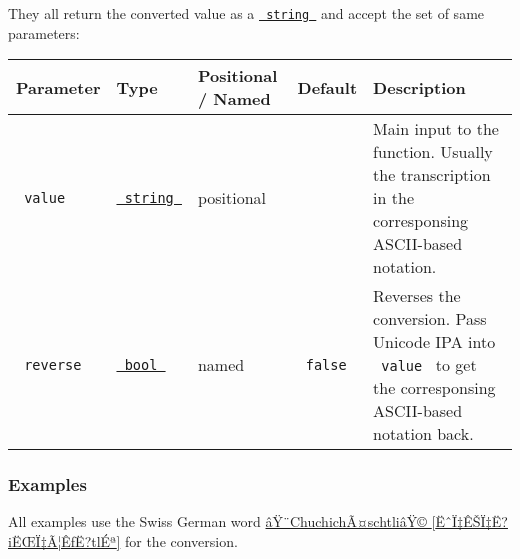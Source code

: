 They all return the converted value as a
\href{https://typst.app/docs/reference/foundations/str/}{\texttt{\ string\ }}
and accept the set of same parameters:

\begin{longtable}[]{@{}lllll@{}}
\toprule\noalign{}
Parameter & Type & Positional / Named & Default & Description \\
\midrule\noalign{}
\endhead
\bottomrule\noalign{}
\endlastfoot
\texttt{\ value\ } &
\href{https://typst.app/docs/reference/foundations/str/}{\texttt{\ string\ }}
& positional & & Main input to the function. Usually the transcription
in the corresponsing ASCII-based notation. \\
\texttt{\ reverse\ } &
\href{https://typst.app/docs/reference/foundations/bool/}{\texttt{\ bool\ }}
& named & \texttt{\ false\ } & Reverses the conversion. Pass Unicode IPA
into \texttt{\ value\ } to get the corresponsing ASCII-based notation
back. \\
\end{longtable}

\subsubsection{Examples}\label{examples}

All examples use the Swiss German word
\href{https://als.wikipedia.org/wiki/Chuchich\%C3\%A4schtli}{âŸ¨ChuchichÃ¤schtliâŸ©
{[}ËˆÏ‡ÊŠÏ‡Ë?iËŒÏ‡Ã¦ÊƒË?tlÉª{]}} for the conversion.

